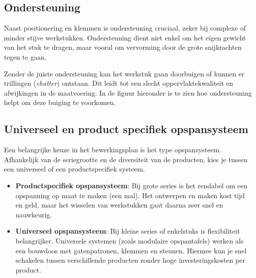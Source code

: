 \documentclass[a4paper,12pt,twoside]{report}
\begin{document}

\subsection{Ondersteuning}
Naast positionering en klemmen is ondersteuning cruciaal, zeker bij complexe of minder stijve werkstukken. Ondersteuning dient niet enkel om het eigen gewicht van het stuk te dragen, maar vooral om vervorming door de grote snijkrachten tegen te gaan. 

Zonder de juiste ondersteuning kan het werkstuk gaan doorbuigen of kunnen er trillingen (\textit{chatter}) ontstaan. Dit leidt tot een slecht oppervlaktekwaliteit en afwijkingen in de maatvoering. In de figuur hieronder is te zien hoe ondersteuning helpt om deze buiging te voorkomen.


\subsection{Universeel en product specifiek opspansysteem}
Een belangrijke keuze in het bewerkingsplan is het type opspansysteem.
Afhankelijk van de seriegrootte en de diversiteit van de producten, kies je tussen een universeel of een productspecifiek systeem.

\begin{itemize}
	\item \textbf{Productspecifiek opspansysteem}: Bij grote series is het rendabel om een opspanning op maat te maken (een mal). Het ontwerpen en maken kost tijd en geld, maar het wisselen van werkstukken gaat daarna zeer snel en nauwkeurig.
	\item \textbf{Universeel opspansysteem}: Bij kleine series of enkelstuks is flexibiliteit belangrijker. Universele systemen (zoals modulaire opspantafels) werken als een bouwdoos met gatenpatronen, klemmen en steunen. Hiermee kun je snel schakelen tussen verschillende producten zonder hoge investeringskosten per product.
\end{itemize}

\end{document}
